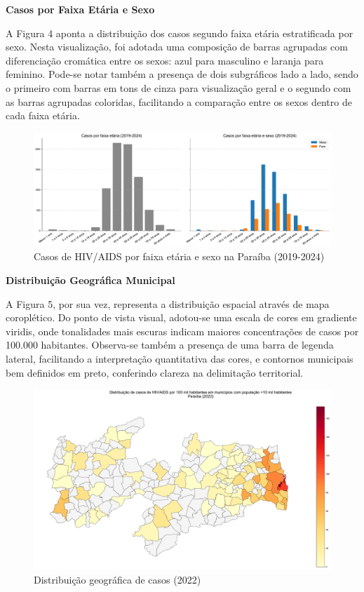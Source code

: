 \documentclass[10pt,a4paper]{article}
\begin{document}
\begin{multicols}{2}
\textbf{Casos por Faixa Etária e Sexo}

A Figura 4 aponta a distribuição dos casos segundo faixa etária estratificada por sexo. Nesta visualização, foi adotada uma composição de barras agrupadas com diferenciação cromática entre os sexos: azul para masculino e laranja para feminino. Pode-se notar também a presença de dois subgráficos lado a lado, sendo o primeiro com barras em tons de cinza para visualização geral e o segundo com as barras agrupadas coloridas, facilitando a comparação entre os sexos dentro de cada faixa etária.

\begin{figure}[H]
    \centering
    \includegraphics[width=\linewidth]{../figs/hiv_aids_pb_sex_age_2019-2022.pdf}
    \caption{Casos de HIV/AIDS por faixa etária e sexo na Paraíba (2019-2024)}
    \label{fig:faixa_etaria_sexo}
\end{figure}

\textbf{Distribuição Geográfica Municipal}

A Figura 5, por sua vez, representa a distribuição espacial através de mapa coroplético. Do ponto de vista visual, adotou-se uma escala de cores em gradiente viridis, onde tonalidades mais escuras indicam maiores concentrações de casos por 100.000 habitantes. Observa-se também a presença de uma barra de legenda lateral, facilitando a interpretação quantitativa das cores, e contornos municipais bem definidos em preto, conferindo clareza na delimitação territorial.

\begin{figure}[H]
    \centering
    \includegraphics[width=\linewidth]{../figs/hiv_aids_pb_municipios_2022.pdf}
    \caption{Distribuição geográfica de casos (2022)}
    \label{fig:mapa_municipios}
\end{figure}


\end{multicols}
\end{document}
